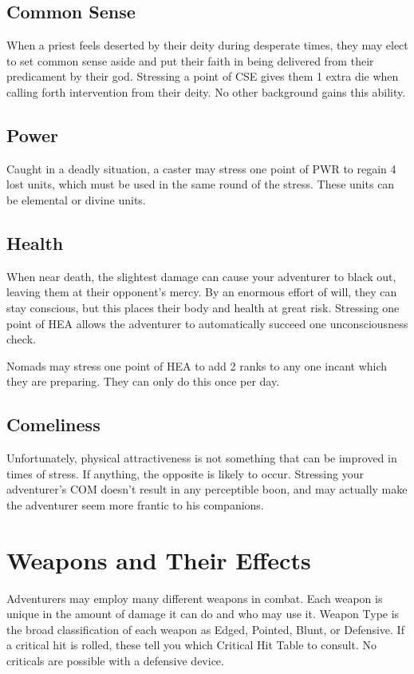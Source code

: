 \subsection{Common Sense}
When a priest feels deserted by their deity during desperate times, they may elect to set common sense aside and put their faith in being delivered from their predicament by their god. Stressing a point of CSE gives them 1 extra die when calling forth intervention from their deity. No other background gains this ability.
\subsection{Power}
Caught in a deadly situation, a caster may stress one point of PWR to regain 4 lost units, which must be used in the same round of the stress. These units can be elemental or divine units.
\subsection{Health}
When near death, the slightest damage can cause your adventurer to black out, leaving them at their opponent's mercy. By an enormous effort of will, they can stay conscious, but this places their body and health at great risk. Stressing one point of HEA allows the adventurer to automatically succeed one unconsciousness check.

Nomads may stress one point of HEA to add 2 ranks to any one incant which they are preparing. They can only do this once per day.
\subsection{Comeliness}
Unfortunately, physical attractiveness is not something that can be improved in times of stress. If anything, the opposite is likely to occur. Stressing your adventurer's COM doesn't result in any perceptible boon, and may actually make the adventurer seem more frantic to his companions.
\section{Weapons and Their Effects}
Adventurers may employ many different weapons in combat. Each weapon is unique in the amount of damage it can do and who may use it.
Weapon Type is the broad classification of each
weapon as Edged, Pointed, Blunt, or Defensive. If a critical hit is rolled, these tell you which Critical Hit Table to consult. No criticals are possible with a defensive device.

